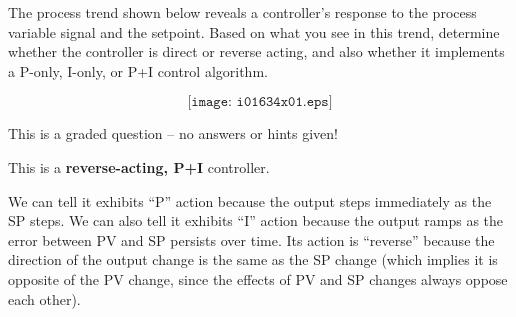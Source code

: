 

The process trend shown below reveals a controller's response to the process variable signal and the setpoint.  Based on what you see in this trend, determine whether the controller is direct or reverse acting, and also whether it implements a P-only, I-only, or P+I control algorithm.

$$\texttt{[image: i01634x01.eps]}$$

\vfil

\eject






This is a graded question -- no answers or hints given!







This is a {\bf reverse-acting, P+I} controller.  

\vskip 10pt

We can tell it exhibits ``P'' action because the output steps immediately as the SP steps.  We can also tell it exhibits ``I'' action because the output ramps as the error between PV and SP persists over time.  Its action is ``reverse'' because the direction of the output change is the same as the SP change (which implies it is opposite of the PV change, since the effects of PV and SP changes always oppose each other).




